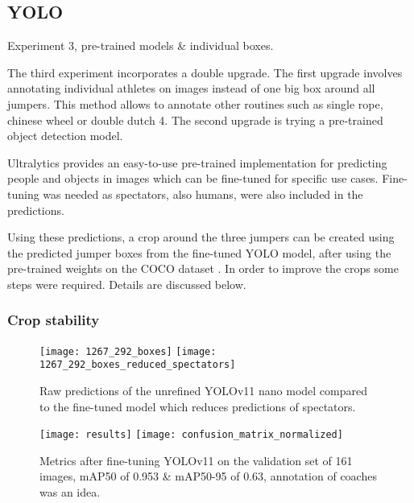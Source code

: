 \subsection{YOLO}

Experiment 3, pre-trained models \& individual boxes.

The third experiment incorporates a double upgrade. The first upgrade involves annotating individual athletes on images instead of one big box around all jumpers. This method allows to annotate other routines such as single rope, chinese wheel or double dutch 4. The second upgrade is trying a pre-trained object detection model.

Ultralytics \autocite{Khanam2024} provides an easy-to-use pre-trained implementation for predicting people and objects in images which can be fine-tuned for specific use cases. Fine-tuning was needed as spectators, also humans, were also included in the predictions.

Using these predictions, a crop around the three jumpers can be created using the predicted jumper boxes from the fine-tuned YOLO model, after using the pre-trained weights on the COCO dataset \autocite{Lin2014}. In order to improve the crops some steps were required. Details are discussed below.

\subsubsection{Crop stability}
\label{results:crop-stability}

\begin{figure}
    \centering
    \texttt{[image: 1267\_292\_boxes]}
    \texttt{[image: 1267\_292\_boxes\_reduced\_spectators]}
    \caption[raw vs fine-tuned YOLOv11 nano model predictions]{Raw predictions of the unrefined YOLOv11 nano model compared to the fine-tuned model which reduces predictions of spectators.}
    \label{fig:raw-vs-fine-tuned-boxes}
\end{figure}

\begin{figure}
    \centering
    \texttt{[image: results]}
    \texttt{[image: confusion\_matrix\_normalized]}
    \caption[metrics after fine-tuning YOLOv11]{Metrics after fine-tuning YOLOv11 on the validation set of 161 images, mAP50 of 0.953 \& mAP50-95 of 0.63, annotation of coaches was an idea.}
    \label{fig:localization-results}
\end{figure}

